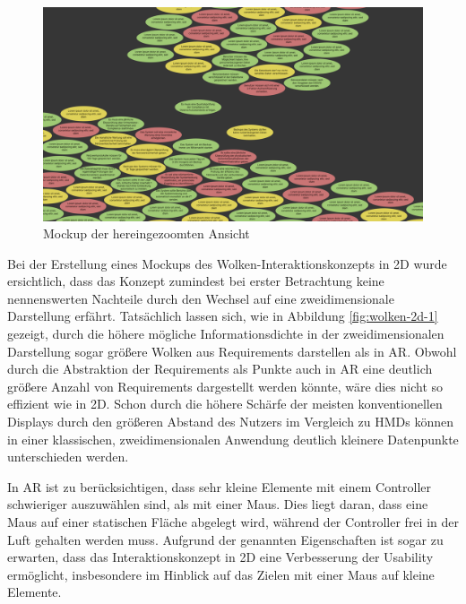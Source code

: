 \begin{figure}[H]
    \centering
    \includegraphics[width=1\textwidth]{images/FigmaWolkenCloseup.png}
    \caption{Mockup der hereingezoomten Ansicht}
    \label{fig:wolken-2d-2}
\end{figure}

Bei der Erstellung eines Mockups des Wolken-Interaktionskonzepts in 2D wurde ersichtlich, dass das Konzept zumindest bei erster Betrachtung keine nennenswerten Nachteile durch den Wechsel auf eine zweidimensionale Darstellung erfährt.
Tatsächlich lassen sich, wie in Abbildung \ref{fig:wolken-2d-1} gezeigt, durch die höhere mögliche Informationsdichte in der zweidimensionalen Darstellung sogar größere Wolken aus Requirements darstellen als in AR.
Obwohl durch die Abstraktion der Requirements als Punkte auch in AR eine deutlich größere Anzahl von Requirements dargestellt werden könnte, wäre dies nicht so effizient wie in 2D.
Schon durch die höhere Schärfe der meisten konventionellen Displays durch den größeren Abstand des Nutzers im Vergleich zu HMDs können in einer klassischen, zweidimensionalen Anwendung deutlich kleinere Datenpunkte unterschieden werden.

In AR ist zu berücksichtigen, dass sehr kleine Elemente mit einem Controller schwieriger auszuwählen sind, als mit einer Maus.
Dies liegt daran, dass eine Maus auf einer statischen Fläche abgelegt wird, während der Controller frei in der Luft gehalten werden muss.
Aufgrund der genannten Eigenschaften ist sogar zu erwarten, dass das Interaktionskonzept in 2D eine Verbesserung der Usability ermöglicht, insbesondere im Hinblick auf das Zielen mit einer Maus auf kleine Elemente.

